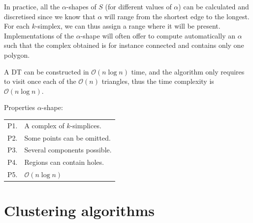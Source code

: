 In practice, all the $\alpha$-shapes of $S$ (for different values of $\alpha$) can be calculated and discretised since we know that $\alpha$ will range from the shortest edge to the longest.
For each $k$-simplex, we can thus assign a range where it will be present.
Implementations of the $\alpha$-shape will often offer to compute automatically an $\alpha$ such that the complex obtained is for instance connected and contains only one polygon.

%

A DT can be constructed in $\mathcal{O}(n \log n)$ time, and the algorithm only requires to visit once each of the $\mathcal{O}(n)$ triangles, thus the time complexity is $\mathcal{O}(n \log n)$.

%

Properties $\alpha$-shape:
\\
\begin{tabular}{@{}ll@{}}
\toprule
  P1. & A complex of $k$-simplices.  \\  
  P2. & Some points can be omitted. \\ 
  P3. & Several components possible.  \\ 
  P4. & Regions can contain holes.  \\  
  P5. & $\mathcal{O}(n \log n)$  \\ 
\bottomrule
\end{tabular}



%
\section{Clustering algorithms}%
\label{sec:clustering}

